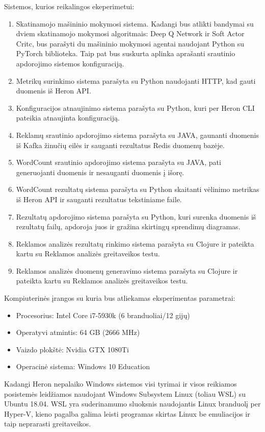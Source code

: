 \documentclass{VUMIFPSbakalaurinis}
\begin{document}
Sistemos, kurios reikalingos ekeperimetui:
\begin{enumerate}
    \item Skatinamojo mašininio mokymosi sistema. Kadangi bus atlikti bandymai su dviem skatinamojo mokymosi algoritmais: Deep Q Network ir Soft Actor Critc, bus parašyti du mašininio mokymosi agentai naudojant Python su PyTorch biblioteka. Taip pat bus suskurta aplinka aprašanti srautinio apdorojimo sistemos konfiguraciją. 
    \item Metrikų surinkimo sistema parašyta su Python naudojanti HTTP, kad gauti duomenis iš Heron API.
    \item Konfiguracijos atnaujinimo sistema parašyta su Python, kuri per Heron CLI pateikia atnaujinta konfiguraciją.
    \item Reklamų srautinio apdorojimo sistema parašyta su JAVA, gaunanti duomenis iš Kafka žinučių eilės ir sauganti rezultatus Redis duomenų bazėje.
    \item WordCount srautinio apdorojimo sistema parašyta su JAVA, pati generuojanti duomenis ir nesauganti duomenis į išorę. 
    \item WordCount rezultatų sistema parašyta su Python skaitanti vėlinimo metrikas iš Heron API ir sauganti rezultatus tekstiniame faile.
    \item Rezultatų apdorojimo sistema parašyta su Python, kuri surenka duomenis iš rezultatų failų, apdoroja  juos ir gražina skirtingų sprendimų diagramas.
    \item Reklamos analizės rezultatų rinkimo sistema parašyta su Clojure ir pateikta kartu su Reklamos analizės greitaveikos testu.
    \item Reklamos analizės duomenų generavimo sistema parašyta su Clojure ir pateikta kartu su Reklamos analizės greitaveikos testu.
\end{enumerate}

Kompiuterinės įrangos su kuria bus atliekamas eksperimentas parametrai:
\begin{itemize}
    \item Procesorius: Intel Core i7-5930k (6 branduoliai/12 gijų)
    \item Operatyvi atmintis: 64 GB (2666 MHz)
    \item Vaizdo plokštė: Nvidia GTX 1080Ti
    \item Operacinė sistema: Windows 10 Education
\end{itemize}

Kadangi Heron nepalaiko Windows sistemos visi tyrimai ir visos reikiamos posistemės leidžiamos naudojant Windows Subsystem Linux (toliau WSL) su Ubuntu 18.04. WSL yra suderinamumo sluoksnis naudojantis Linux branduolį per Hyper-V, kieno pagalba galima leisti programas skirtas Linux be emuliacijos ir taip neprarasti greitaveikos.
\end{document}
